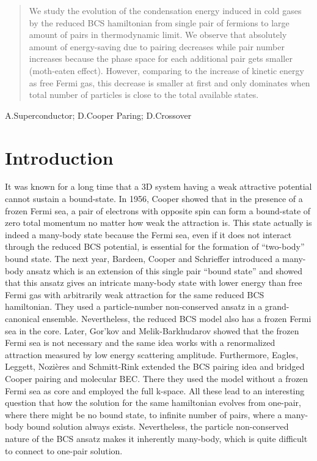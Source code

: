 \documentclass[3p,twocolumn]{elsarticle}
\begin{document}
\begin{abstract}
We study the evolution of the condensation energy induced in cold gases by the  reduced BCS hamiltonian from single pair of fermions to large amount of pairs in thermodynamic limit.  We observe that absolutely amount of energy-saving due to pairing decreases while pair number increases because the phase space for each additional pair gets smaller (moth-eaten effect).  However, comparing to the increase of kinetic energy as free Fermi gas, this decrease is smaller at first and only dominates  when total number of particles is close to the total available states.  
\end{abstract}
\begin{keyword}
A.Superconductor; D.Cooper Paring; D.Crossover
\end{keyword}

\maketitle
\section{Introduction}
It was known for a long time that a 3D system having a weak attractive potential cannot sustain a bound-state.  In 1956, Cooper showed that in the presence of a frozen Fermi sea, a pair of electrons with opposite spin can form a bound-state of zero total momentum  no matter how weak the attraction is\cite{Cooper}.  This state actually is indeed a many-body state because the  Fermi sea, even if it does not interact through the reduced BCS potential,  is essential for the formation of ``two-body'' bound state.   The next year, Bardeen, Cooper and Schrieffer introduced a many-body ansatz which is an extension of this single pair ``bound state'' and showed that this ansatz gives an intricate many-body state with lower energy than free Fermi gas with arbitrarily weak attraction\cite{BCS} for the same reduced BCS hamiltonian.  They used a particle-number non-conserved ansatz in a grand-canonical ensemble.  Nevertheless, the reduced BCS model also has a frozen Fermi sea in the core. Later,   Gor'kov and Melik-Barkhudarov showed that the frozen Fermi sea is not necessary and the same idea works with a renormalized attraction measured by low energy scattering amplitude\cite{Gorkov}.   Furthermore, Eagles\cite{Eagle}, Leggett\cite{LeggettCrossover}, Nozi\`{e}res and Schmitt-Rink\cite{Nozieres} extended the BCS pairing idea and bridged Cooper pairing and molecular BEC. There they used the model without a frozen Fermi sea as core and employed the full k-space.  All these lead to an interesting question that how the solution for the same hamiltonian evolves from one-pair, where there might be no bound state, to infinite number of pairs, where a many-body bound solution always exists.  Nevertheless, the particle non-conserved nature of the BCS ansatz makes it inherently many-body, which is quite difficult to connect to one-pair solution.  
\end{document}

